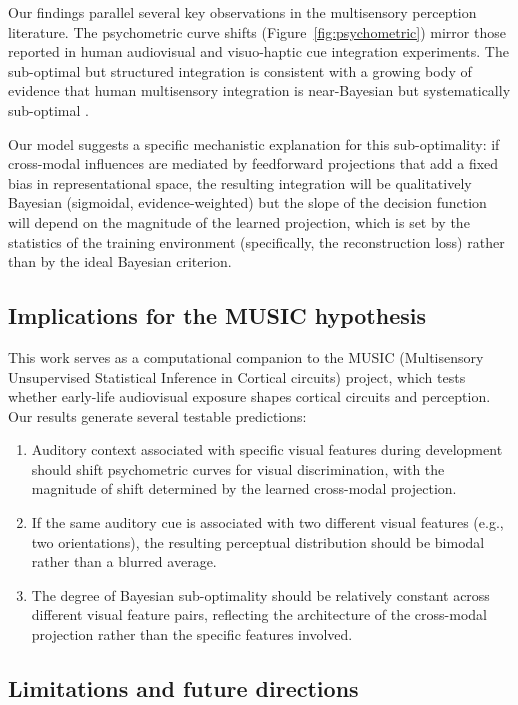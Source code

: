\documentclass[11pt,a4paper]{article}
\begin{document}
Our findings parallel several key observations in the multisensory perception literature.
The psychometric curve shifts (Figure~\ref{fig:psychometric}) mirror those reported in human audiovisual \citep{alais2004ventriloquist} and visuo-haptic \citep{ernst2002humans} cue integration experiments.
The sub-optimal but structured integration is consistent with a growing body of evidence that human multisensory integration is near-Bayesian but systematically sub-optimal \citep{rahnev2011suboptimality, drugowitsch2016computational}.

Our model suggests a specific mechanistic explanation for this sub-optimality: if cross-modal influences are mediated by feedforward projections that add a fixed bias in representational space, the resulting integration will be qualitatively Bayesian (sigmoidal, evidence-weighted) but the slope of the decision function will depend on the magnitude of the learned projection, which is set by the statistics of the training environment (specifically, the reconstruction loss) rather than by the ideal Bayesian criterion.

\subsection{Implications for the MUSIC hypothesis}

This work serves as a computational companion to the MUSIC (Multisensory Unsupervised Statistical Inference in Cortical circuits) project, which tests whether early-life audiovisual exposure shapes cortical circuits and perception.
Our results generate several testable predictions:
\begin{enumerate}
    \item Auditory context associated with specific visual features during development should shift psychometric curves for visual discrimination, with the magnitude of shift determined by the learned cross-modal projection.
    \item If the same auditory cue is associated with two different visual features (e.g., two orientations), the resulting perceptual distribution should be bimodal rather than a blurred average.
    \item The degree of Bayesian sub-optimality should be relatively constant across different visual feature pairs, reflecting the architecture of the cross-modal projection rather than the specific features involved.
\end{enumerate}

\subsection{Limitations and future directions}
\end{document}
